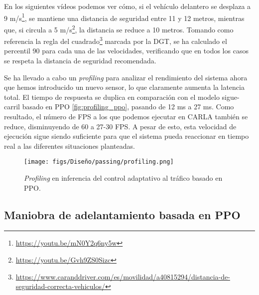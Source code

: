 En los siguientes vídeos podemos ver cómo, si el vehículo delantero se desplaza a 9 m/s\footnote{\url{https://youtu.be/mN0Y2q6ny5w}}, se mantiene una distancia de seguridad entre 11 y 12 metros, mientras que, si circula a 5 m/s\footnote{\url{https://youtu.be/Gvh9ZS0Sizc}}, la distancia se reduce a 10 metros. Tomando como referencia la regla del cuadrado\footnote{\url{https://www.caranddriver.com/es/movilidad/a40815294/distancia-de-seguridad-correcta-vehiculos/}} marcada por la \ac{DGT},  se ha calculado el percentil 90 para cada una de las velocidades, verificando que en todos los casos se respeta la distancia de seguridad recomendada.

Se ha llevado a cabo un \textit{profiling} para analizar el rendimiento del sistema ahora que hemos introducido un nuevo sensor, lo que claramente aumenta la latencia total. El tiempo de respuesta se duplica en comparación con el modelo sigue-carril basado en \ac{PPO} \ref{fig:profiling_ppo}, pasando de 12 ms a 27 ms. Como resultado, el número de \ac{FPS} a los que podemos ejecutar en CARLA también se reduce, disminuyendo de 60 a 27-30 \ac{FPS}. A pesar de esto, esta velocidad de ejecución sigue siendo suficiente para que el sistema pueda reaccionar en tiempo real a las diferentes situaciones planteadas.

\begin{figure}[ht]
\centering
\texttt{[image: figs/Diseño/passing/profiling.png]}
\caption{\textit{Profiling} en inferencia del control adaptativo al tráfico basado en \ac{PPO}.}
\label{fig:profiling_ppo_passing}
\end{figure}

\subsection{Maniobra de adelantamiento basada en PPO}

